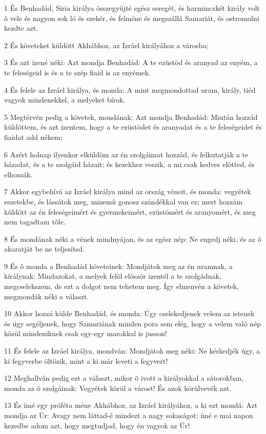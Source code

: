 \par 1 És Benhadád, Siria királya összegyûjté egész seregét, és harminczkét király volt õ vele és nagyon sok ló és szekér, és felméne és megszállá Samariát, és ostromolni kezdte azt.
\par 2 És követeket küldött Akhábhoz, az Izráel királyához a városba;
\par 3 És azt izené néki: Azt mondja Benhadád: A te ezüstöd és aranyad az enyém, a te feleségeid is és a te szép fiaid is az enyémek.
\par 4 És felele az Izráel királya, és monda: A mint megmondottad uram, király, tiéd vagyok mindenekkel, a melyeket bírok.
\par 5 Megtérvén pedig a követek, mondának: Azt mondja Benhadád: Miután hozzád küldöttem, és azt izentem, hogy a te ezüstödet és aranyadat és a te feleségeidet és fiaidat add nékem;
\par 6 Azért holnap ilyenkor elküldöm az én szolgáimat hozzád, és felkutatják a te házadat, és a te szolgáid házait; és kezekhez veszik, a mi csak kedves elõtted, és elhozzák.
\par 7 Akkor egybehívá az Izráel királya mind az ország véneit, és monda: vegyétek eszetekbe, és lássátok meg, minemû gonosz szándékkal van ez; mert hozzám küldött az én feleségeimért és gyermekeimért, ezüstömért és aranyomért, és meg nem tagadtam tõle.
\par 8 És mondának néki a vének mindnyájan, és az egész nép: Ne engedj néki, és az õ akaratját be ne teljesítsd.
\par 9 És õ monda a Benhadád követeinek: Mondjátok meg az én uramnak, a királynak: Mindazokat, a melyek felõl elõször izentél a te szolgádnak, megcselekszem, de ezt a dolgot nem tehetem meg. Így elmenvén a követek, megmondák néki a választ.
\par 10 Akkor hozzá külde Benhadád, és monda: Úgy cselekedjenek velem az istenek és úgy segéljenek, hogy Samariának minden pora sem elég, hogy a velem való nép közül mindeniknek csak egy-egy marokkal is jusson!
\par 11 És felele az Izráel királya, mondván: Mondjátok meg néki: Ne kérkedjék úgy, a ki fegyverbe öltözik, mint a ki már leveti a fegyvert!
\par 12 Meghallván pedig ezt a választ, mikor õ ivott a királyokkal a sátorokban, monda az õ szolgáinak: Vegyétek körül a várost! És azok körülvevék azt.
\par 13 És ímé egy próféta méne Akhábhoz, az Izráel királyához, a ki ezt mondá: Azt mondja az Úr: Avagy nem láttad-é mindezt a nagy sokaságot: ímé e mai napon kezedbe adom azt, hogy megtudjad, hogy én vagyok az Úr!

